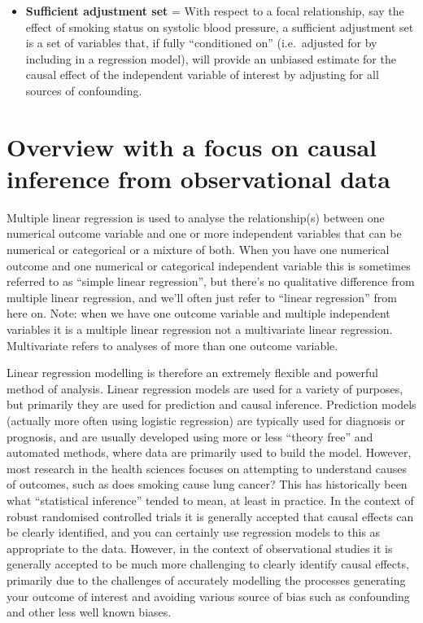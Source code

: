 \documentclass[
]{book}
\begin{document}
\begin{itemize}
\item
  \textbf{Sufficient adjustment set} = With respect to a focal relationship, say the effect of smoking status on systolic blood pressure, a sufficient adjustment set is a set of variables that, if fully ``conditioned on'' (i.e.~adjusted for by including in a regression model), will provide an unbiased estimate for the causal effect of the independent variable of interest by adjusting for all sources of confounding.
\end{itemize}

\hypertarget{overview-with-a-focus-on-causal-inference-from-observational-data}{%
\section{Overview with a focus on causal inference from observational data}\label{overview-with-a-focus-on-causal-inference-from-observational-data}}

Multiple linear regression is used to analyse the relationship(s) between one numerical outcome variable and one or more independent variables that can be numerical or categorical or a mixture of both. When you have one numerical outcome and one numerical or categorical independent variable this is sometimes referred to as ``simple linear regression'', but there's no qualitative difference from multiple linear regression, and we'll often just refer to ``linear regression'' from here on. Note: when we have one outcome variable and multiple independent variables it is a multiple linear regression not a multivariate linear regression. Multivariate refers to analyses of more than one outcome variable.

Linear regression modelling is therefore an extremely flexible and powerful method of analysis. Linear regression models are used for a variety of purposes, but primarily they are used for prediction and causal inference. Prediction models (actually more often using logistic regression) are typically used for diagnosis or prognosis, and are usually developed using more or less ``theory free'' and automated methods, where data are primarily used to build the model. However, most research in the health sciences focuses on attempting to understand causes of outcomes, such as does smoking cause lung cancer? This has historically been what ``statistical inference'' tended to mean, at least in practice. In the context of robust randomised controlled trials it is generally accepted that causal effects can be clearly identified, and you can certainly use regression models to this as appropriate to the data. However, in the context of observational studies it is generally accepted to be much more challenging to clearly identify causal effects, primarily due to the challenges of accurately modelling the processes generating your outcome of interest and avoiding various source of bias such as confounding and other less well known biases.
\end{document}
